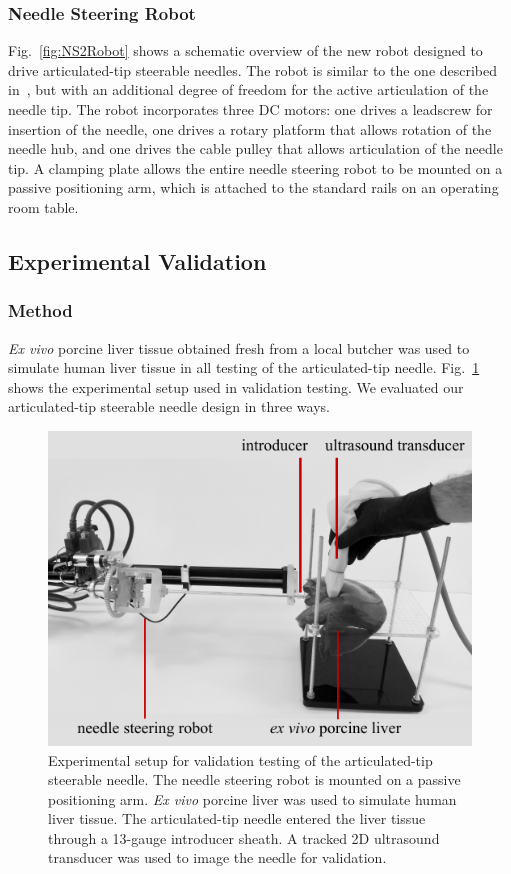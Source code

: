 \subsubsection{Needle Steering Robot}
Fig.~\ref{fig:NS2Robot} shows a schematic overview of the new robot designed to drive articulated-tip steerable needles. The robot is similar to the one described in~\cite{Majewicz2012}, but with an additional degree of freedom for the active articulation of the needle tip. The robot incorporates three DC motors: one drives a leadscrew for insertion of the needle, one drives a rotary platform that allows rotation of the needle hub, and one drives the cable pulley that allows articulation of the needle tip. A clamping plate allows the entire needle steering robot to be mounted on a passive positioning arm, which is attached to the standard rails on an operating room table. 

\subsection{Experimental Validation}

\subsubsection{Method}
\textit{Ex vivo} porcine liver tissue obtained fresh from a local butcher was used to simulate human liver tissue in all testing of the articulated-tip needle. Fig.~\ref{fig:ExperimentalSetupArticulatedTip} shows the experimental setup used in validation testing. We evaluated our articulated-tip steerable needle design in three ways. 

\begin{figure}[!t]
\centering
\includegraphics[width=0.6\columnwidth]{Images/Chapter3/ExperimentalSetup/ExperimentalSetup}
\caption[Setup for validation testing of the articulated-tip needle]{Experimental setup for validation testing of the articulated-tip steerable needle. The needle steering robot is mounted on a passive positioning arm. \textit{Ex vivo} porcine liver was used to simulate human liver tissue. The articulated-tip needle entered the liver tissue through a 13-gauge introducer sheath. A tracked 2D ultrasound transducer was used to image the needle for validation. }
\label{fig:ExperimentalSetupArticulatedTip}
\end{figure} 

